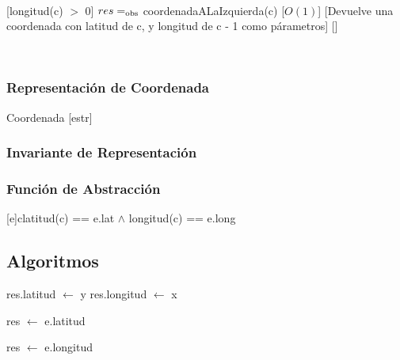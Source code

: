 ~

[longitud(c) $>$ 0]
{$res =_{\mathrm{obs}}$ coordenadaALaIzquierda(c)}
[$O(1)$]
[Devuelve una coordenada con latitud de c, y longitud de c - 1 como párametros]
[]

~

\subsubsection{Representación de Coordenada}

\begin{Estructura}{ Coordenada }[estr]
	\begin{Tupla}[estr]
	\end{Tupla}

\end{Estructura}


\subsubsection{Invariante de Representación}


\subsubsection{Función de Abstracción}

[e]{c}{latitud(c) == e.lat $\land$ longitud(c) == e.long}

\subsection{Algoritmos}

\begin{algorithm}[H]
	\SetAlgoLined
	\NoCaptionOfAlgo
	\caption{}
	res.latitud $\leftarrow$ y\;
	res.longitud $\leftarrow$ x\;
\end{algorithm}

\begin{algorithm}[H]
	\SetAlgoLined
	\NoCaptionOfAlgo
	\caption{}
	res $\leftarrow$ e.latitud\;
\end{algorithm}

\begin{algorithm}[H]
	\SetAlgoLined
	\NoCaptionOfAlgo
	\caption{}
	res $\leftarrow$ e.longitud\;
\end{algorithm}


